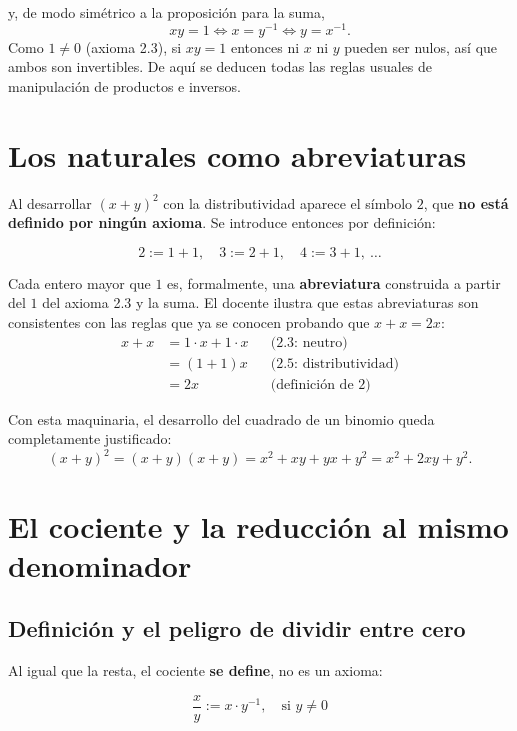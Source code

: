 \documentclass[12pt,a4paper]{article}
\begin{document}
y, de modo simétrico a la proposición para la suma,
\[
xy = 1 \iff x = y^{-1} \iff y = x^{-1}.
\]
Como $1\ne 0$ (axioma 2.3), si $xy=1$ entonces ni $x$ ni $y$ pueden ser
nulos, así que ambos son invertibles. De aquí se deducen todas las reglas
usuales de manipulación de productos e inversos.

\section{Los naturales como abreviaturas}

Al desarrollar $(x+y)^2$ con la distributividad aparece el símbolo $2$, que
\textbf{no está definido por ningún axioma}. Se introduce entonces por
definición:

\begin{keybox}
\[
\boxed{2 := 1+1, \quad 3 := 2+1, \quad 4:=3+1, \ \ldots}
\]
\end{keybox}

Cada entero mayor que $1$ es, formalmente, una \textbf{abreviatura}
construida a partir del $1$ del axioma 2.3 y la suma. El docente ilustra que
estas abreviaturas son consistentes con las reglas que ya se conocen
probando que $x+x=2x$:
\begin{align}
x + x &= 1\cdot x + 1\cdot x && \text{(2.3: neutro)} \\
&= (1+1)x && \text{(2.5: distributividad)} \\
&= 2x && \text{(definición de } 2\text{)}
\end{align}

Con esta maquinaria, el desarrollo del cuadrado de un binomio queda
completamente justificado:
\[
(x+y)^2 = (x+y)(x+y) = x^2 + xy + yx + y^2 = x^2 + 2xy + y^2.
\]

\section{El cociente y la reducción al mismo denominador}

\subsection{Definición y el peligro de dividir entre cero}

Al igual que la resta, el cociente \textbf{se define}, no es un axioma:

\begin{keybox}
\[
\boxed{\dfrac{x}{y} := x \cdot y^{-1}, \quad \text{si } y \ne 0}
\]
\end{keybox}
\end{document}
